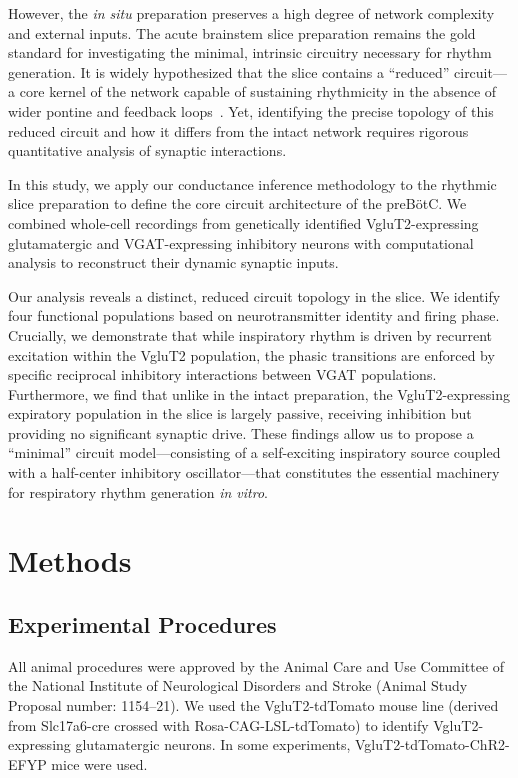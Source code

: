 \documentclass{article}
\begin{document}
However, the \textit{in situ} preparation preserves a high degree of network complexity and external inputs. The acute brainstem slice preparation remains the gold standard for investigating the minimal, intrinsic circuitry necessary for rhythm generation. It is widely hypothesized that the slice contains a ``reduced'' circuit---a core kernel of the network capable of sustaining rhythmicity in the absence of wider pontine and feedback loops~\citep{smith2007spatial}. Yet, identifying the precise topology of this reduced circuit and how it differs from the intact network requires rigorous quantitative analysis of synaptic interactions.

In this study, we apply our conductance inference methodology to the rhythmic slice preparation to define the core circuit architecture of the preBötC. We combined whole-cell recordings from genetically identified VgluT2-expressing glutamatergic and VGAT-expressing inhibitory neurons with computational analysis to reconstruct their dynamic synaptic inputs.

Our analysis reveals a distinct, reduced circuit topology in the slice. We identify four functional populations based on neurotransmitter identity and firing phase. Crucially, we demonstrate that while inspiratory rhythm is driven by recurrent excitation within the VgluT2 population, the phasic transitions are enforced by specific reciprocal inhibitory interactions between VGAT populations. Furthermore, we find that unlike in the intact preparation, the VgluT2-expressing expiratory population in the slice is largely passive, receiving inhibition but providing no significant synaptic drive. These findings allow us to propose a ``minimal'' circuit model---consisting of a self-exciting inspiratory source coupled with a half-center inhibitory oscillator---that constitutes the essential machinery for respiratory rhythm generation \textit{in vitro}.

\section{Methods}

\subsection{Experimental Procedures}
All animal procedures were approved by the Animal Care and Use Committee of the National Institute of Neurological Disorders and Stroke (Animal Study Proposal number: 1154--21). We used the VgluT2-tdTomato mouse line (derived from Slc17a6-cre crossed with Rosa-CAG-LSL-tdTomato) to identify VgluT2-expressing glutamatergic neurons. In some experiments, VgluT2-tdTomato-ChR2-EFYP mice were used.
\end{document}
